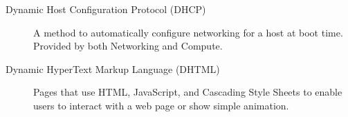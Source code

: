 \documentclass[letterpaper,10pt,english]{sphinxmanual}
\begin{document}
\begin{description}
\item[{Dynamic Host Configuration Protocol (DHCP)}] \leavevmode{}\label{_source/glossary:term-dynamic-host-configuration-protocol-dhcp}
A method to automatically configure networking for a host at
boot time. Provided by both Networking and Compute.

\item[{Dynamic HyperText Markup Language (DHTML)}] \leavevmode{}\label{_source/glossary:term-dynamic-hypertext-markup-language-dhtml}
Pages that use HTML, JavaScript, and Cascading Style Sheets to
enable users to interact with a web page or show simple
animation.

\end{description}
\end{document}
